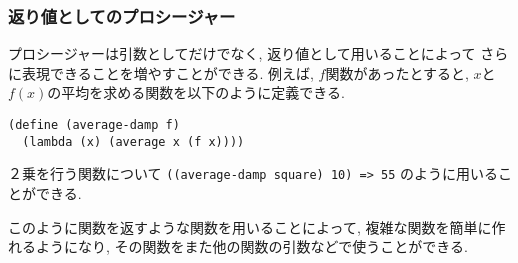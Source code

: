 \setcounter{subsubsection}{3}
\subsubsection{返り値としてのプロシージャー}
プロシージャーは引数としてだけでなく, 返り値として用いることによって
さらに表現できることを増やすことができる. 例えば, $f$関数があったとすると,
$x$と$f(x)$の平均を求める関数を以下のように定義できる.

\begin{lstlisting}[basicstyle=\footnotesize]
(define (average-damp f)
  (lambda (x) (average x (f x))))
\end{lstlisting}
\noindent
２乗を行う関数について
\lstinline[basicstyle=\footnotesize]{((average-damp square) 10) => 55}
のように用いることができる.

このように関数を返すような関数を用いることによって, 複雑な関数を簡単に作れるようになり,
その関数をまた他の関数の引数などで使うことができる.
